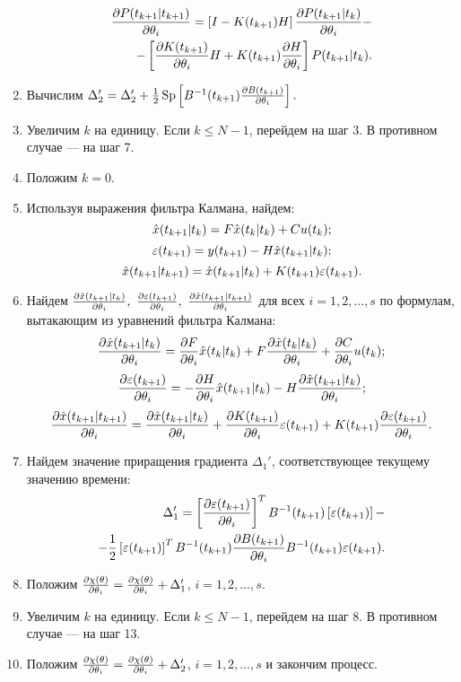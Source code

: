 \documentclass[a4paper,14pt]{extarticle}
\DeclareMathOperator{\Sp}{Sp}
\begin{document}
\begin{enumerate}
\begin{equation*}
\begin{split}
	\frac{\partial P(t_{k+1}|t_{k+1})}{\partial \theta_i} = \left[ I - K(t_{k+1}) H \right] \frac{\partial P(t_{k+1}|t_k)}{\partial \theta_i} - \\ -
	\left[ \frac{\partial K(t_{k+1})}{\partial \theta_i} H + K(t_{k+1}) \frac{\partial H}{\partial \theta_i} \right] P(t_{k+1}|t_k).
\end{split}
\end{equation*}

\item Вычислим $\Delta_2' = \Delta_2' + \frac{1}{2} \Sp \left[ \inv{B}(\fut)
\pdpk{B(\fut)} \right].$

\item Увеличим $k$ на единицу. Если $k \le N-1$, перейдем на шаг 3. В противном
случае --- на шаг 7.

\item Положим $k = 0$.

\item Используя выражения фильтра Калмана, найдем:
\[
	\hat{x}(t_{k+1}|t_k) = F \hat{x}(t_k|t_k) + C u(t_k);
\]
\[
	\varepsilon(t_{k+1}) = y(t_{k+1}) - H \hat{x}(t_{k+1}|t_k);
\]
\[
	\hat{x}(t_{k+1}|t_{k+1}) = \hat{x}(t_{k+1}|t_k) + K(t_{k+1}) \varepsilon(t_{k+1}).
\]

\item Найдем $\pdpk{\hat{x}(\pred)},\ \pdpk{\eps(\fut)},\
\pdpk{\hat{x}(\estfut)}$ для всех $i = 1, 2, \ldots, s$ по формулам, вытакающим
из уравнений фильтра Калмана:
\[
	\frac{\partial \hat{x}(t_{k+1}|t_k)}{\partial \theta_i} = \frac{\partial F}{\partial \theta_i} \hat{x}(t_k|t_k) + F \frac{\partial \hat{x}(t_k|t_k)}{\partial \theta_i} +
	\frac{\partial C}{\partial \theta_i} u(t_k);
\]
\[
	\frac{\partial \varepsilon(t_{k+1})}{\partial \theta_i} = -\frac{\partial H}{\partial \theta_i} \hat{x}(t_{k+1}|t_k) - H \frac{\partial \hat{x}(t_{k+1}|t_k)}{\partial \theta_i};
\]
\[
	\frac{\partial \hat{x}(t_{k+1}|t_{k+1})}{\partial \theta_i} = \frac{\partial \hat{x}(t_{k+1}|t_k)}{\partial \theta_i} + \frac{\partial K(t_{k+1})}{\partial \theta_i} \varepsilon(t_{k+1}) +
	K(t_{k+1}) \frac{\partial \varepsilon(t_{k+1})}{\partial \theta_i}.
\]

\item Найдем значение приращения градиента $\Delta_1'$, соответствующее
текущему значению времени:
\begin{equation*}
\begin{split}
	\Delta_1' = \left[ \frac{\partial \varepsilon(t_{k+1})}{\partial \theta_i} \right]^T B^{-1}(t_{k+1})
	\left[ \varepsilon(t_{k+1}) \right] - \\ - \frac{1}{2} \left[ \varepsilon(t_{k+1}) \right]^T
	B^{-1}(t_{k+1}) \frac{\partial B(t_{k+1})}{\partial \theta_i} B^{-1}(t_{k+1}) \varepsilon(t_{k+1}).
\end{split}
\end{equation*}

\item Положим $\frac{\partial \chi(\theta)}{\partial \theta_i} = \frac{\partial \chi(\theta)}{\partial \theta_i} + \Delta_1'$,
$i = 1, 2, \ldots, s$.

\item Увеличим $k$ на единицу. Если $k \le N-1$, перейдем на шаг 8.
В противном случае --- на шаг 13.

\item Положим $\frac{\partial \chi(\theta)}{\partial \theta_i} = \frac{\partial \chi(\theta)}{\partial \theta_i} + \Delta_2'$,
$i = 1, 2, \ldots, s$ и закончим процесс.

\end{enumerate}
\end{document}
